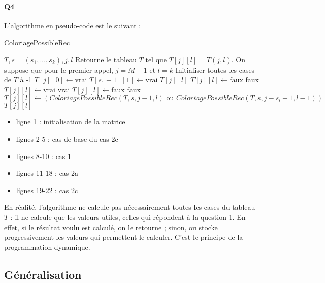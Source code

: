 \documentclass[12pt]{article}
\newcommand{\true}{\text{vrai}}
\newcommand{\false}{\text{faux}}
\begin{document}
			\paragraph{Q4} L'algorithme en pseudo-code est le suivant :
				\begin{algorithm} [H]
					\caption{ColoriagePossibleRec}
					\label{color_poss_rec}
					\begin{algorithmic}[1]
						\REQUIRE $T, s=(s_1,...,s_k), j, l$ 
						\ENSURE Retourne le tableau $ T $ tel que $ T[j][l] = T(j,l) $. On suppose que pour le premier appel, $ j = M-1 $ et $ l = k $
						\STATE Initialiser toutes les cases de $ T $ à -1
							\STATE $ T[j][0] \leftarrow \true $
						\ENDFOR
						\STATE $ T[s_1-1][1] \leftarrow \true $
							\RETURN $ T[j][l] $
							\STATE $ T[j][l] \leftarrow \false $
							\RETURN faux
								\STATE $ T[j][l] \leftarrow \true $
								\RETURN vrai
							\ELSE
								\STATE$ T[j][l] \leftarrow \false $
								\RETURN faux
							\ENDIF
						\ELSE
							\STATE $ T[j][l] \leftarrow (ColoriagePossibleRec(T,s,j-1,l) \text{ ou } ColoriagePossibleRec(T,s,j-s_l-1,l-1)) $
							\RETURN $ T[j][l] $
						\ENDIF
					\end{algorithmic}
				\end{algorithm}
		
				\begin{itemize}
					\item ligne 1 : initialisation de la matrice
					\item lignes 2-5 : cas de base du cas 2c
					\item lignes 8-10 : cas 1
					\item lignes 11-18 : cas 2a
					\item lignes 19-22 : cas 2c
				\end{itemize}
	
				En réalité, l'algorithme ne calcule pas nécessairement toutes les cases du tableau $ T $ : il ne calcule que les valeurs utiles, celles qui répondent à la question 1. En effet, si le résultat voulu est calculé, on le retourne ; sinon, on stocke progressivement les valeurs qui permettent le calculer. C'est le principe de la programmation dynamique.
		
		\subsection{Généralisation}
		
\end{document}
